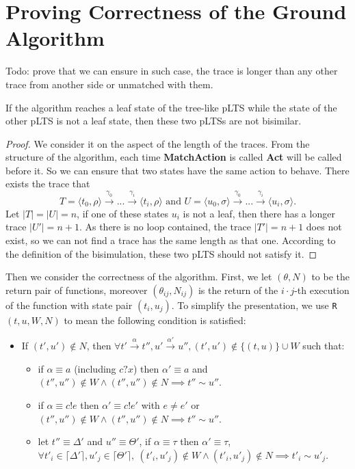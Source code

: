 \documentclass[a4paper,UKenglish,cleveref, autoref]{lipics-v2019}
\begin{document}
\section{Proving Correctness of the Ground Algorithm}

\begin{lemma}
	Todo: prove that we can ensure in such case, the trace is  longer than any other trace from another side or unmatched with them.
\end{lemma}
\begin{theorem}
	If the algorithm reaches a leaf state of the tree-like pLTS while the state of the other pLTS is not a leaf state, then these two pLTSs are not bisimilar.
\end{theorem}
\begin{proof}
	We consider it on the aspect of the length of the traces. From the structure of the algorithm, each time \textbf{MatchAction} is called \textbf{Act} will be called before it. So we can ensure that two states have the same action to behave. There exists the trace that
	\[T = \langle t_0,\rho\rangle\xrightarrow{\gamma_0}...\xrightarrow{\gamma_i}\langle t_i,\rho\rangle\text{ and }U = \langle u_0,\sigma\rangle\xrightarrow{\gamma_0}...\xrightarrow{\gamma_i}\langle u_i,\sigma\rangle.\]
	Let $|T|=|U|=n$, if one of these states $u_i$ is not a leaf, then there has a longer trace $|U'|=n+1$. As there is no loop contained, the trace $|T'|=n+1$ does not exist, so we can not find a trace has the same length as that one. According to the definition of the bisimulation, these two pLTS should not satisfy it.
\end{proof}

Then we consider the correctness of the algorithm. First, we let $(\theta, N)$ to be the return pair of functions, moreover $(\theta_{ij}, N_{ij})$ is the return of the $i\cdot j$-th execution of the function with state pair $(t_i,u_j)$. To simplify the presentation, we use \texttt{R}$(t,u,W,N)$ to mean the following condition is satisfied:
\begin{itemize}
    \item If $(t',u')\notin N$, then $\forall t'\xrightarrow{\alpha}t'',u'\xrightarrow{\alpha'}u'', (t',u')\notin\{(t,u)\}\cup W$ such that: 
    \begin{itemize}
        \item if $\alpha\equiv a$ (including $c?x$) then $\alpha'\equiv a$ and $(t'',u'')\notin W\wedge(t'',u'')\notin N\implies t''\sim u''$.
        \item if $\alpha\equiv c!e$ then $\alpha'\equiv c!e'$ with $e\neq e'$ or $(t'',u'')\notin W\wedge(t'',u'')\notin N\implies t''\sim u''$.
        \item let $t''\equiv \Delta'$ and $u''\equiv \Theta'$, if $\alpha\equiv \tau$ then $\alpha'\equiv \tau$, $\forall t'_i\in \lceil\Delta'\rceil, u'_j\in \lceil\Theta'\rceil,\ (t'_i,u'_j)\notin W\wedge(t'_i,u'_j)\notin N\implies t'_i\sim u'_j$.
    \end{itemize}
\end{itemize}
\end{document}
